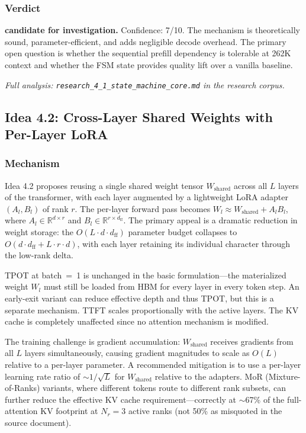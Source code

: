 \documentclass[11pt]{article}
\begin{document}
\subsubsection*{Verdict}

\noindent\textbf{candidate for investigation.} Confidence: 7/10. The mechanism is theoretically sound, parameter-efficient, and adds negligible decode overhead. The primary open question is whether the sequential prefill dependency is tolerable at 262K context and whether the FSM state provides quality lift over a vanilla baseline.

\par\noindent\textit{Full analysis: \texttt{research\_4\_1\_state\_machine\_core.md} in the research corpus.}


\subsection{Idea 4.2: Cross-Layer Shared Weights with Per-Layer LoRA}
\label{subsec:idea42}

\subsubsection*{Mechanism}

Idea 4.2 proposes reusing a single shared weight tensor $W_{\text{shared}}$ across all $L$ layers of the transformer, with each layer augmented by a lightweight LoRA adapter $(A_l, B_l)$ of rank $r$. The per-layer forward pass becomes $W_l \approx W_{\text{shared}} + A_l B_l$, where $A_l \in \mathbb{R}^{d \times r}$ and $B_l \in \mathbb{R}^{r \times d_{\text{ff}}}$. The primary appeal is a dramatic reduction in weight storage: the $O(L \cdot d \cdot d_{\text{ff}})$ parameter budget collapses to $O(d \cdot d_{\text{ff}} + L \cdot r \cdot d)$, with each layer retaining its individual character through the low-rank delta.

TPOT at batch~=~1 is unchanged in the basic formulation---the materialized weight $W_l$ must still be loaded from HBM for every layer in every token step. An early-exit variant can reduce effective depth and thus TPOT, but this is a separate mechanism. TTFT scales proportionally with the active layers. The KV cache is completely unaffected since no attention mechanism is modified.

The training challenge is gradient accumulation: $W_{\text{shared}}$ receives gradients from all $L$ layers simultaneously, causing gradient magnitudes to scale as $O(L)$ relative to a per-layer parameter. A recommended mitigation is to use a per-layer learning rate ratio of $\sim 1/\sqrt{L}$ for $W_{\text{shared}}$ relative to the adapters. MoR (Mixture-of-Ranks) variants, where different tokens route to different rank subsets, can further reduce the effective KV cache requirement---correctly at $\sim$67\% of the full-attention KV footprint at $N_r = 3$ active ranks (not 50\% as misquoted in the source document).
\end{document}
